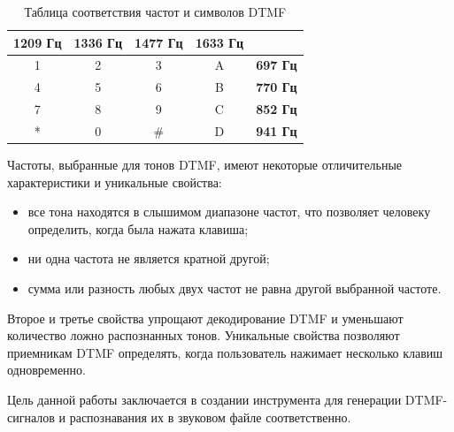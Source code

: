 \begin{table}[ht]
\centering\small
	\caption{Таблица соответствия частот и символов DTMF}
	\label{tab:lrt}	
\begin{tabular}{|c|c|c|c|l|}
\hline
\multicolumn{1}{|l|}{\textbf{1209 Гц}} & \multicolumn{1}{l|}{\textbf{1336 Гц}} & \multicolumn{1}{l|}{\textbf{1477 Гц}} & \multicolumn{1}{l|}{\textbf{1633 Гц}} &                 \\ \hline
1                                      & 2                                     & 3                                     & A                                     & \textbf{697 Гц} \\ \hline
4                                      & 5                                     & 6                                     & B                                     & \textbf{770 Гц} \\ \hline
7                                      & 8                                     & 9                                     & C                                     & \textbf{852 Гц} \\ \hline
*                                      & 0                                     & \#                                    & D                                     & \textbf{941 Гц} \\ \hline
\end{tabular}\normalsize%
\end{table}

Частоты, выбранные для тонов DTMF, имеют некоторые отличительные характеристики и уникальные свойства:

\begin{itemize}
	\item все тона находятся в слышимом диапазоне частот, что позволяет человеку определить, когда была нажата клавиша;
	\item ни одна частота не является кратной другой;
	\item сумма или разность любых двух частот не равна другой выбранной частоте.
\end{itemize} 

Второе и третье свойства упрощают декодирование DTMF и уменьшают количество ложно распознанных тонов. Уникальные свойства позволяют приемникам DTMF определять, когда пользователь нажимает несколько клавиш одновременно.

Цель данной работы заключается в создании инструмента для генерации DTMF-сигналов и распознавания их в звуковом файле соответственно.

